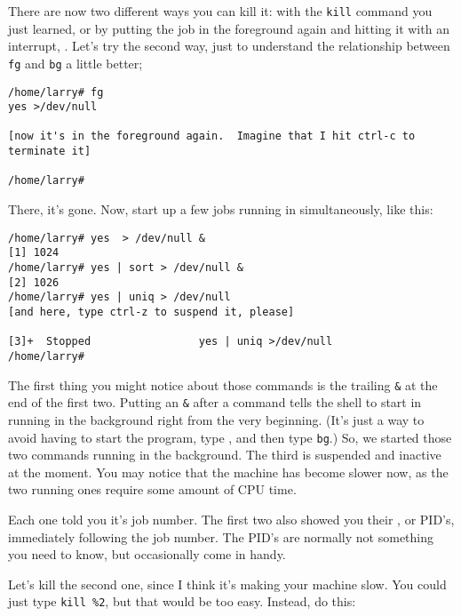         There are now two different ways you can kill it: with the
{\tt kill} command you just learned, or by putting the job in the
foreground again and hitting it with an interrupt, .  Let's try
the second way, just to understand the relationship between {\tt fg}
and {\tt bg} a little better;

\begin{screen}\begin{verbatim}
/home/larry# fg
yes >/dev/null 

[now it's in the foreground again.  Imagine that I hit ctrl-c to terminate it]

/home/larry#
\end{verbatim}\end{screen}

        There, it's gone.  Now, start up a few jobs running in
simultaneously, like this:


\begin{screen}\begin{verbatim}
/home/larry# yes  > /dev/null &
[1] 1024
/home/larry# yes | sort > /dev/null &
[2] 1026
/home/larry# yes | uniq > /dev/null 
[and here, type ctrl-z to suspend it, please]

[3]+  Stopped                 yes | uniq >/dev/null
/home/larry#
\end{verbatim}\end{screen}

The first thing you might notice about those commands is the trailing
{\tt \&} at the end of the first two.  \index{\&} Putting an {\tt \&}
after a command tells the shell to start in running in the background
right from the very beginning.  (It's just a way to avoid having to
start the program, type , and then type {\tt bg}.)  So, we
started those two commands running in the background.  The third is
suspended and inactive at the moment.  You may notice that the machine
has become slower now, as the two running ones
require some amount of CPU time.

Each one told you it's job number.  The first two also showed you
their , or PID's, 
immediately following the job number.  The PID's are normally not
something you need to know, but occasionally come in handy.

        Let's kill the second one, since I think it's making your
machine slow.  You could just type {\tt kill \%2}, but that would be
too easy.  Instead, do this:

